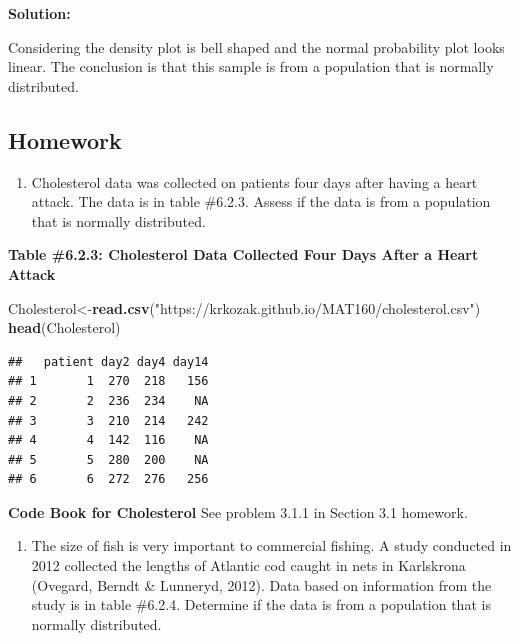 \documentclass[
]{book}
\newenvironment{Shaded}{\begin{snugshade}}{\end{snugshade}}
\newcommand{\KeywordTok}[1]{\textcolor[rgb]{0.13,0.29,0.53}{\textbf{#1}}}
\newcommand{\NormalTok}[1]{#1}
\newcommand{\StringTok}[1]{\textcolor[rgb]{0.31,0.60,0.02}{#1}}
\providecommand{\tightlist}{%
  \setlength{\itemsep}{0pt}\setlength{\parskip}{0pt}}
\begin{document}
\textbf{Solution:}

Considering the density plot is bell shaped and the normal probability plot looks linear. The conclusion is that this sample is from a population that is normally distributed.

\hypertarget{homework-14}{%
\subsection{Homework}\label{homework-14}}

\begin{enumerate}
\def\labelenumi{\arabic{enumi}.}
\tightlist
\item
  Cholesterol data was collected on patients four days after having a heart attack. The data is in table \#6.2.3. Assess if the data is from a population that is normally distributed.
\end{enumerate}

\textbf{Table \#6.2.3: Cholesterol Data Collected Four Days After a Heart Attack}

\begin{Shaded}
\begin{Highlighting}[]
\NormalTok{Cholesterol<-}\KeywordTok{read.csv}\NormalTok{(}\StringTok{"https://krkozak.github.io/MAT160/cholesterol.csv"}\NormalTok{)}
\KeywordTok{head}\NormalTok{(Cholesterol)}
\end{Highlighting}
\end{Shaded}

\begin{verbatim}
##   patient day2 day4 day14
## 1       1  270  218   156
## 2       2  236  234    NA
## 3       3  210  214   242
## 4       4  142  116    NA
## 5       5  280  200    NA
## 6       6  272  276   256
\end{verbatim}

\textbf{Code Book for Cholesterol} See problem 3.1.1 in Section 3.1 homework.

\begin{enumerate}
\def\labelenumi{\arabic{enumi}.}
\setcounter{enumi}{1}
\tightlist
\item
  The size of fish is very important to commercial fishing. A study conducted in 2012 collected the lengths of Atlantic cod caught in nets in Karlskrona (Ovegard, Berndt \& Lunneryd, 2012). Data based on information from the study is in table \#6.2.4. Determine if the data is from a population that is normally distributed.
\end{enumerate}
\end{document}
